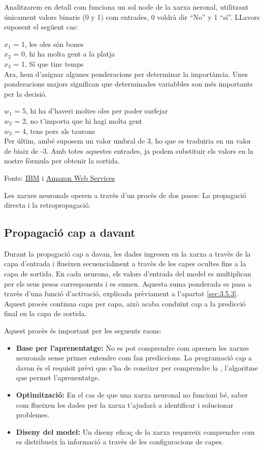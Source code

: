 {Analitzarem en detall com funciona un sol node de la xarxa neronal, utilitzant únicament valors binaris (0 y 1) com entrades, 0 voldrà dir ``No'' y 1 ``sí''.
LLavors suposent el següent cas:

$x_1$ = 1, les oles són bones\\
$x_2$ = 0, hi ha molta gent a la platja\\
$x_3$ = 1, Sí que tinc temps\\

Ara, hem d'asignar algunes ponderacions per determinar la importància. Unes ponderacions majors significan que determinades variabbles son més importants per la decisió.

$w_1$ = 5, hi ha d'haveri moltes oles per poder surfejar\\
$w_2$ = 2, no t'importa que hi hagi molta gent\\
$w_3$ = 4, tens pors als taurons \\

Per últim, ambé suposem un valor umbral de 3, ho que es traduiria en un valor de biaix de -3. Amb totes aquestes entrades, ja podem substituir els valors en la nostre fòrmula per obtenir la sortida.

Fonts: \href{https://www.ibm.com/es-es/think/topics/neural-networks}{IBM} i \href{https://aws.amazon.com/es/what-is/neural-network/}{Amazon Web Services}

Les xarxes neuronals operen a travès d'un procès de dos pasos: La propagació directa i la retropropagació.

\subsection{Propagació cap a davant}\label{subsec:propagació}
Durant la propagació cap a davan, les dades ingresen en la xarxa a travès de la capa d'entrada i flueixen secuencialment a travès de les capes ocultes fins a la capa de sortida. En cada neurona, els valors d'entrada del model es multiplican per els seus pesos corresponents i es sumen. Aquesta suma ponderada es pasa a travès d'una funció d'activació, explicada prèviament a l'apartat \ref{sec:3.5.3}. Aquest procès continua capa per capa, això acaba conduïnt cap a la predicció final en la capa de sortida.

Aquest procès és important per les seguents raons:
\begin{itemize}
 \item \textbf{Base per l'aprenentatge:} No es pot comprendre com aprenen les xarxes neuronals sense primer entendre com fan prediccions. La programació cap a davan és el requisit prèvi que s'ha de coneixer per comprendre la , l'algoritme que permet l'aprenentatge.
 \item \textbf{Optimització:} En el cas de que una xarxa neuronal no funcioni bé, saber com flueixen les dades per la xarxa t'ajudarà a identificar i solucionar problemes.
 \item \textbf{Diseny del model:} Un diseny eficaç de la xarxa requereix comprendre com es distribueix la informació a travès de les configuracions de capes.
\end{itemize}

}
